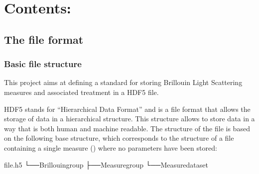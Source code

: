 \documentclass[letterpaper,10pt,english]{sphinxmanual}
\begin{document}
\begin{sphinxVerbatim}[commandchars=\\\{\}]

    

  \PYG{p}{[}\PYG{p}{]}
\end{sphinxVerbatim}


\chapter{Contents:}
\label{\detokenize{index:contents}}
\sphinxstepscope


\section{The file format}
\label{\detokenize{source/file_format:the-file-format}}\label{\detokenize{source/file_format::doc}}

\subsection{Basic file structure}
\label{\detokenize{source/file_format:basic-file-structure}}
\sphinxAtStartPar
This project aims at defining a standard for storing Brillouin Light Scattering measures and associated treatment in a HDF5 file.

\sphinxAtStartPar
HDF5 stands for “Hierarchical Data Format” and is a file format that allows the storage of data in a hierarchical structure. This structure allows to store data in a way that is both human and machine readable. The structure of the file is based on the following base structure, which corresponds to the structure of a file containing a single measure () where no parameters have been stored:

\begin{sphinxVerbatim}[commandchars=\\\{\}]
file.h5
└──Brillouingroup
├──Measuregroup
└──Measuredataset
\end{sphinxVerbatim}
\end{document}
